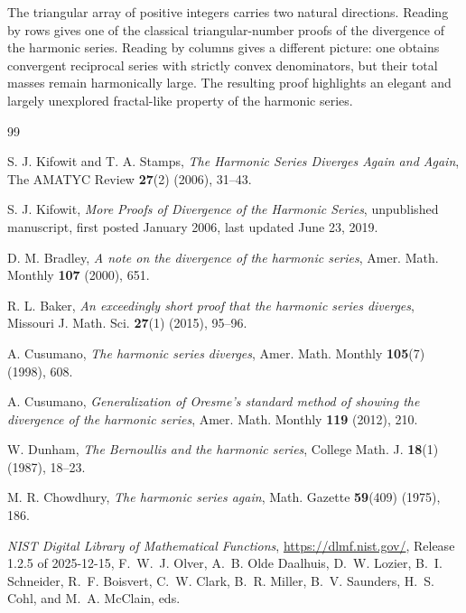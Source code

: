 \documentclass{article}
\theoremstyle{theorem}
\theoremstyle{definition}
\begin{document}
The triangular array of positive integers carries two natural directions. Reading by rows gives one of the classical triangular-number proofs of the divergence of the harmonic series. Reading by columns gives a different picture: one obtains convergent reciprocal series with strictly convex denominators, but their total masses remain harmonically large. The resulting proof highlights an elegant and largely unexplored fractal-like property of the harmonic series.
\begin{thebibliography}{99}

S. J. Kifowit and T. A. Stamps,
\emph{The Harmonic Series Diverges Again and Again},
The AMATYC Review \textbf{27}(2) (2006), 31--43.

S. J. Kifowit,
\emph{More Proofs of Divergence of the Harmonic Series},
unpublished manuscript, first posted January 2006, last updated June 23, 2019.

D. M. Bradley,
\emph{A note on the divergence of the harmonic series},
Amer. Math. Monthly \textbf{107} (2000), 651.

R. L. Baker,
\emph{An exceedingly short proof that the harmonic series diverges},
Missouri J. Math. Sci. \textbf{27}(1) (2015), 95--96.

A. Cusumano,
\emph{The harmonic series diverges},
Amer. Math. Monthly \textbf{105}(7) (1998), 608.

A. Cusumano,
\emph{Generalization of Oresme's standard method of showing the divergence of the harmonic series},
Amer. Math. Monthly \textbf{119} (2012), 210.

W. Dunham,
\emph{The Bernoullis and the harmonic series},
College Math. J. \textbf{18}(1) (1987), 18--23.

M. R. Chowdhury,
\emph{The harmonic series again},
Math. Gazette \textbf{59}(409) (1975), 186.

\emph{NIST Digital Library of Mathematical Functions},
\url{https://dlmf.nist.gov/},
Release 1.2.5 of 2025-12-15,
F.~W.~J. Olver, A.~B. Olde Daalhuis, D.~W. Lozier, B.~I. Schneider,
R.~F. Boisvert, C.~W. Clark, B.~R. Miller, B.~V. Saunders,
H.~S. Cohl, and M.~A. McClain, eds.

\end{thebibliography}
\end{document}
